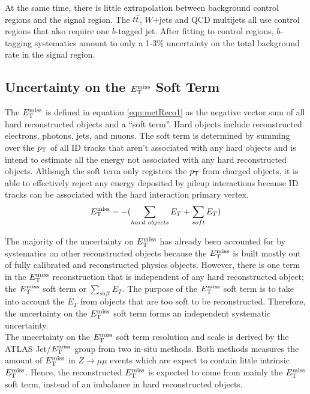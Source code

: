 \indent At the same time, there is little extrapolation between background control regions and the signal region. The $t\bar{t}$, $W$+jets and QCD multijets all use control regions that also require one $b$-tagged jet.  After fitting to control regions, $b$-tagging systematics amount to only a 1-3\% uncertainty on the total background rate in the signal region.  \\

\subsection{Uncertainty on the $E_{\mathrm{T}}^{\mathrm{miss}}$ Soft Term}

\indent The $E_{\mathrm{T}}^{\mathrm{miss}}$ is defined in equation \ref{eqn:metReco1} as the negative vector sum of all hard reconstructed objects and a ``soft term''.  Hard objects include reconstructed electrons, photons, jets, and muons.  The soft term is determined by summing over the $p_{\mathrm{T}}$ of all ID tracks that aren't associated with any hard objects and is intend to estimate all the energy not associated with any hard reconstructed objects.  Although the soft term only registers the $p_{\mathrm{T}}$ from charged objects, it is able to effectively reject any energy deposited by pileup interactions because ID tracks can be associated with the hard interaction primary vertex. \\

\begin{equation}
E_{\mathrm{T}}^{\mathrm{miss}} = - ( \sum_{hard~objects} E_T + \sum_{soft} E_T ) 
\label{eqn:metReco1}
\end{equation}

\indent  The majority of the uncertainty on $E_{\mathrm{T}}^{\mathrm{miss}}$ has already been accounted for by systematics on other reconstructed objects because the $E_{\mathrm{T}}^{\mathrm{miss}}$ is built mostly out of fully calibrated and reconstructed physics objects.  However, there is one term in the $E_{\mathrm{T}}^{\mathrm{miss}}$ reconstruction that is independent of any hard reconstructed object; the $E_{\mathrm{T}}^{\mathrm{miss}}$ soft term or $\sum_{soft} E_T$.  The purpose of the $E_{\mathrm{T}}^{\mathrm{miss}}$ soft term is to take into account the $E_T$ from objects that are too soft to be reconstructed.  Therefore, the uncertainty on the $E_{\mathrm{T}}^{\mathrm{miss}}$ soft term forms an independent systematic uncertainty.  \\

\indent The uncertainty on the $E_{\mathrm{T}}^{\mathrm{miss}}$ soft term resolution and scale is derived by the ATLAS Jet/$E_{\mathrm{T}}^{\mathrm{miss}}$ group from two in-situ methods.  Both methods measures the amount of $E_{\mathrm{T}}^{\mathrm{miss}}$ in $Z\rightarrow \mu\mu$ events which are expect to contain little intrinsic $E_{\mathrm{T}}^{\mathrm{miss}}$.\cite{METPerform}  Hence, the reconstructed $E_{\mathrm{T}}^{\mathrm{miss}}$ is expected to come from mainly the $E_{\mathrm{T}}^{\mathrm{miss}}$ soft term, instead of an imbalance in hard reconstructed objects.  \\

